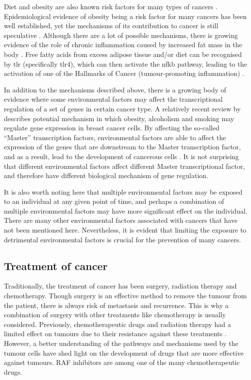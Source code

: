 Diet and obesity are also known risk factors for many types of cancers \citep{Ames1995,Calle2004}.
Epidemiological evidence of obesity being a risk factor for many cancers has been well established, yet the mechanisms of its contribution to cancer is still  speculative \citep{Calle2003,Kelesidis2006}.
Although there are a lot of possible mechanisms, there is growing evidence of the role of chronic inflammation caused by increased fat mass in the body \citep{Kelesidis2006,Lumeng2011,Hernandez2013}.
Free fatty acids from excess adipose tissue and/or diet can be recognised by \gls{tlr} (specifically \gls{tlr}4), which can then activate the \gls{nfkb} pathway, leading to the activation of one of the Hallmarks of Cancer (tumour-promoting inflammation) \citep{Lumeng2011}.

In addition to the mechanisms described above, there is a growing body of evidence where some environmental factors may affect the transcriptional regulation of a set of genes in certain cancer type.
A relatively recent review by \citet{Perez-Solis2016} describes potential mechanism in which obesity, alcoholism and smoking may regulate gene expression in breast cancer cells.
By affecting the so-called ``Master'' transcription factors, environmental factors are able to affect the expression of the genes that are downstream to the Master transcription factor, and as a result, lead to the development of cancerous cells \citep{Perez-Solis2016}.
It is not surprising that different environmental factors affect different Master transcriptional factor, and therefore have different biological mechanism of gene regulation.

It is also worth noting here that multiple  environmental factors may be exposed to an individual at any given point of time, and perhaps a combination of multiple environmental factors may have more significant effect on the individual.
There are many other environmental factors associated with cancers that have not been mentioned here.
Nevertheless, it is evident that limiting the exposure to detrimental environmental factors is crucial for the prevention of many cancers.

\subsection{Treatment of cancer}
\label{sub:treatment_of_cancer}

Traditionally, the treatment of cancer has been surgery, radiation therapy and chemotherapy.
Though surgery is an effective method to remove the tumour from the patient, there is always risk of metastasis and recurrence.
This is why a combination of surgery with other treatments like chemotherapy is usually considered.
Previously, chemotherapeutic drugs and radiation therapy had a limited effect on tumours due to their resistance against these treatments \citep{Wilhelm2006}.
However, a better understanding of the pathways and mechanisms used by the tumour cells have shed  light on the development of drugs that are more effective against tumours.
RAF inhibitors are among one of the many chemotherapeutic drugs.

